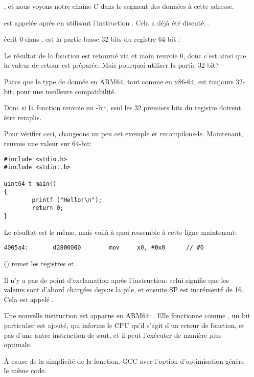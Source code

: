 , et nous voyons notre chaîne C  dans le  segment
des données à cette adresse.


\puts est appelée après en utilisant l'instruction . Cela a déjà été discuté: .

\MOV écrit 0 dans .
 est la partie basse 32 bits du registre 64-bit :



Le résultat de la fonction est retourné via  et main renvoie 0, donc c'est ainsi que la valeur
de retour est préparée.
Mais pourquoi utiliser la partie 32-bit?

Parce que le type de donnée \Tint en ARM64, tout comme en x86-64, est toujours 32-bit, pour une
meilleure compatibilité.

Donc si la fonction renvoie un -bit, seul les 32 premiers bits du registre  doivent
être remplis.

Pour vérifier ceci, changeons un peu cet exemple et recompilons-le.
Maintenant, \main renvoie une valeur sur 64-bit:

\begin{lstlisting}[caption=\main renvoie une valeur de type \TT{uint64\_t} type,style=customc]
#include <stdio.h>
#include <stdint.h>

uint64_t main()
{
        printf ("Hello!\n");
        return 0;
}
\end{lstlisting}

Le résultat est le même, mais voilà à quoi ressemble \MOV à cette ligne maintenant:

\begin{lstlisting}[caption=GCC 4.8.1 \NonOptimizing + objdump]
  4005a4:       d2800000        mov     x0, #0x0      // #0
\end{lstlisting}


 () remet les registres  et .

Il n'y a pas de point d'exclamation après l'instruction: celui signifie que les valeurs sont
d'abord chargées depuis la pile, et ensuite \ac{SP} est incrémenté de 16.
Cela est appelé .

Une nouvelle instruction est apparue en ARM64: \RET.
Elle fonctionne comme , un  bit particulier est ajouté, qui informe le \ac{CPU}
qu'il s'agit d'un retour de fonction, et pas d'une autre instruction de saut, et il peut l'exécuter
de manière plus optimale. 

À cause de la simplicité de la fonction, GCC avec l'option d'optimisation génère le même code.
